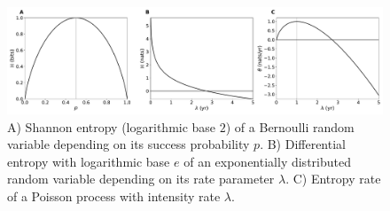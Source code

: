 \documentclass[smallextended]{svjour3}
\newcommand{\E}{\mathbb{E}}
\newcommand{\suml}{\sum\limits}
\newcommand{\ie}{i.e.}
\begin{document}
% 
% 
% 	
% 
\begin{figure}[htbp]
  \vspace{-0.6cm}
  \centering
  \includegraphics[width=1.0\linewidth]{figs/simple_entropy_py}
  \caption[Entropy of Bernoulli- and exponentially distributed random variables, entropy rate of Poisson process.]{A) Shannon entropy (logarithmic base $2$) of a Bernoulli random variable depending on its success probability $p$.
  B) Differential entropy with logarithmic base $e$ of an exponentially distributed random variable depending on its rate parameter $\lambda$.
  C) Entropy rate of a Poisson process with intensity rate $\lambda$.}
  \label{fig:simple_entropy}
\end{figure}
\end{document}
